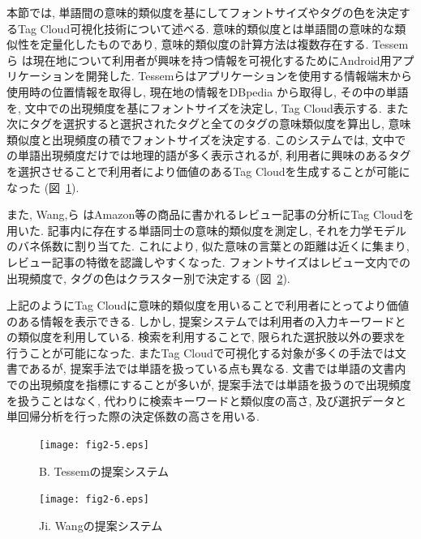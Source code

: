 \documentclass[sotsuron]{kuee}
\begin{document}
本節では, 単語間の意味的類似度を基にしてフォントサイズやタグの色を決定するTag Cloud可視化技術について述べる.
意味的類似度とは単語間の意味的な類似性を定量化したものであり, 意味的類似度の計算方法は複数存在する.
Tessemら
\cite{2.3-1}は現在地について利用者が興味を持つ情報を可視化するためにAndroid用アプリケーションを開発した.
Tessemらはアプリケーションを使用する情報端末から使用時の位置情報を取得し,
現在地の情報をDBpedia
\cite{2.3-3}から取得し, その中の単語を, 文中での出現頻度を基にフォントサイズを決定し, Tag Cloud表示する.
また次にタグを選択すると選択されたタグと全てのタグの意味類似度を算出し, 意味類似度と出現頻度の積でフォントサイズを決定する.
このシステムでは, 文中での単語出現頻度だけでは地理的語が多く表示されるが,
利用者に興味のあるタグを選択させることで利用者により価値のあるTag Cloudを生成することが可能になった
(図~\ref{2-5}).

また, Wang,ら
\cite{2.3-2}はAmazon等の商品に書かれるレビュー記事の分析にTag Cloudを用いた.
記事内に存在する単語同士の意味的類似度を測定し, それを力学モデルのバネ係数に割り当てた.
これにより, 似た意味の言葉との距離は近くに集まり, レビュー記事の特徴を認識しやすくなった.
フォントサイズはレビュー文内での出現頻度で, タグの色はクラスター別で決定する
(図~\ref{2-6}).

上記のようにTag Cloudに意味的類似度を用いることで利用者にとってより価値のある情報を表示できる.
しかし, 提案システムでは利用者の入力キーワードとの類似度を利用している.
検索を利用することで, 限られた選択肢以外の要求を行うことが可能になった.
またTag Cloudで可視化する対象が多くの手法では文書であるが, 提案手法では単語を扱っている点も異なる.
文書では単語の文書内での出現頻度を指標にすることが多いが, 提案手法では単語を扱うので出現頻度を扱うことはなく,
代わりに検索キーワードと類似度の高さ, 及び選択データと単回帰分析を行った際の決定係数の高さを用いる.

\begin{figure}
  \begin{center}
    \unitlength=1mm
   \texttt{[image: fig2-5.eps]}
  \end{center}
  \caption{B. Tessemの提案システム}
  \label{2-5}
\end{figure}

\begin{figure}
  \begin{center}
    \unitlength=1mm
   \texttt{[image: fig2-6.eps]}
  \end{center}
  \caption{Ji. Wangの提案システム}
  \label{2-6}
\end{figure}

\end{document}

